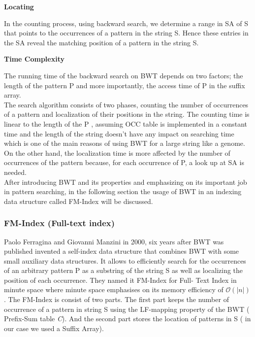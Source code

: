 \documentclass[11pt,a4paper]{report}
\begin{document}

\textbf{Locating} 


In the counting process, using backward search, we determine
a range in SA of S that points to the occurrences of a pattern
in the string S. Hence these entries in the SA reveal the 
matching position of a pattern in the string S.




\textbf{Time Complexity} 

The running time of the backward search on BWT 
depends on two factors; the length of the 
pattern P and more importantly, the access 
time of P in the suffix array.\\
The search algorithm consists of two phases, 
counting the number of occurrences of a pattern 
and localization of their positions in the string.
The counting time is linear to the length of 
the P , assuming OCC table is implemented in a 
constant time and the length of the string doesn't 
have any impact on searching time which is one 
of the main reasons of using BWT for a large 
string like a genome. On the other hand, the 
localization time is more affected by the number 
of occurrences of the pattern  because, for 
each occurrence of P, a look up at SA is needed.\\

After introducing BWT and its properties and 
emphasizing on its important job in pattern 
searching, in the following section the usage 
of BWT in an indexing data structure called 
FM-Index will be discussed\cite{fmindex}. 





\subsubsection{FM-Index (Full-text index)}  
\label{FM-Index (Full-text index)}

Paolo Ferragina and Giovanni Manzini in 2000, six years after BWT was 
published invented a self-index data structure that combines BWT with some 
small auxiliary data structures. It allows to efficiently search for the 
occurrences of an arbitrary pattern P as a substring of the string S as well 
as localizing the position of each occurrence. They named it FM-Index for Full-
Text Index in minute space where minute space emphasises on its memory efficiency
of $\mathcal{O}(\lvert n \rvert)$ .
The FM-Index is consist of two parts. The first part keeps the number of
occurrence of a pattern in string S using the LF-mapping property of the 
BWT ( Prefix-Sum table \emph{C}). And the second part stores the location 
of patterns in S ( in our case we used a Suffix Array)\cite{Wavthesis}.\\
\end{document}
